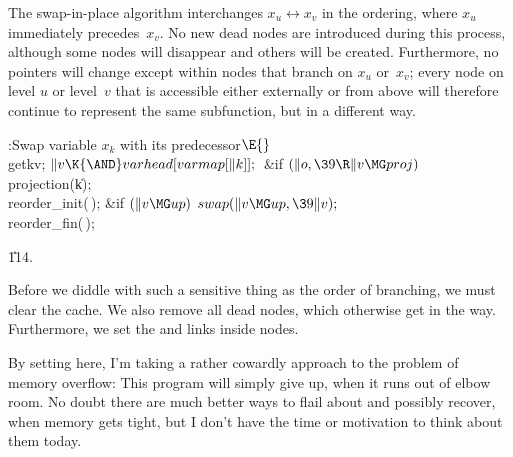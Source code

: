 The swap-in-place algorithm interchanges $x_u\leftrightarrow x_v$
in the ordering, where $x_u$ immediately precedes~$x_v$. No new dead nodes are
introduced during this process, although some nodes will disappear
and others will be created. Furthermore, no pointers will change
except within nodes that branch on $x_u$ or~$x_v$; every node on
level $u$ or level~$v$ that is accessible either externally or from above
will therefore continue to represent the same subfunction, but in a
different way.

\Y\B\4:Swap variable $x_k$ with its predecessor\X${}\E{}$\6
\\{getkv};\5
${}\|v\K{\AND}\\{varhead}[\\{varmap}[\|k]];{}$\6
\&{if} ${}(\|o,\39\R\|v\MG\\{proj}){}$\1\5
\\{projection}(\|k);\2\6
\\{reorder\_init}(\,);\6
\&{if} ${}(\|v\MG\\{up}){}$\1\5
${}\\{swap}(\|v\MG\\{up},\39\|v);{}$\2\6
\\{reorder\_fin}(\,);\par
\U114.\fi

Before we diddle with such a sensitive thing as the order of branching,
we must clear the cache. We also remove all dead nodes, which otherwise
get in the way. Furthermore, we set the  and  links
inside  nodes.

By setting  here, I'm taking a rather cowardly
approach
to the problem of memory overflow: This program will simply give up,
when it runs out of elbow room. No doubt there are much better ways
to flail about and possibly recover, when memory gets tight, but I
don't have the time or motivation to think about them today.

